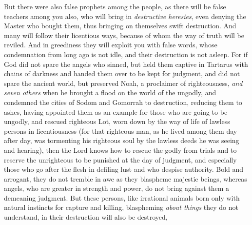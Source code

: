 \begin{biblechapter} %
 But there were also false prophets among the people, as there will be false teachers among you also, who will bring in \textit{destructive heresies}, even denying the Master who bought them, thus bringing on themselves swift destruction.
\verse And many will follow their licentious ways, because of whom the way of truth will be reviled.
\verse And in greediness they will exploit you with false words, whose condemnation from long ago is not idle, and their destruction is not asleep.
\verse For if God did not spare the angels who sinned, but held them captive in Tartarus with chains of darkness and handed them over to be kept for judgment,
\verse and did not spare the ancient world, but preserved Noah, a proclaimer of righteousness, \textit{and seven others} when he brought a flood on the world of the ungodly,
\verse and condemned the cities of Sodom and Gomorrah to destruction, reducing them to ashes, having appointed them as an example for those who are going to be ungodly,
\verse and rescued righteous Lot, worn down by the way of life of lawless persons in licentiousness
\verse (for that righteous man, as he lived among them day after day, was tormenting his righteous soul by the lawless deeds he was seeing and hearing),
\verse then the Lord knows how to rescue the godly from trials and to reserve the unrighteous to be punished at the day of judgment,
\verse and especially those who go after the flesh in defiling lust and who despise authority.
\verse Bold and arrogant, they do not tremble in awe as they blaspheme majestic beings,
\verse whereas angels, who are greater in strength and power, do not bring against them a demeaning judgment.
\verse But these persons, like irrational animals born only with natural instincts for capture and killing, blaspheming \textit{about things} they do not understand, in their destruction will also be destroyed,

\end{biblechapter}
